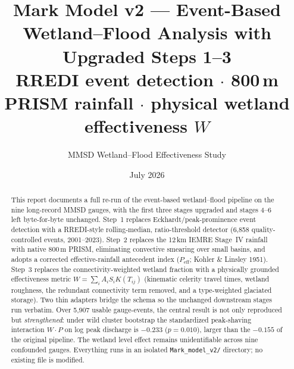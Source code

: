 \documentclass[11pt]{article}
\title{\textbf{Mark Model v2 --- Event-Based Wetland--Flood Analysis with
Upgraded Steps 1--3}\\[4pt]
\large RREDI event detection $\cdot$ 800\,m PRISM rainfall $\cdot$ physical wetland
effectiveness $W$}
\author{MMSD Wetland--Flood Effectiveness Study}
\date{July 2026}
\begin{document}
\maketitle
\vspace{-1em}
\begin{abstract}\noindent\small
This report documents a full re-run of the event-based wetland--flood pipeline on the nine
long-record MMSD gauges, with the first three stages upgraded and stages 4--6 left byte-for-byte
unchanged. Step~1 replaces Eckhardt/peak-prominence event detection with a RREDI-style
rolling-median, ratio-threshold detector (6{,}858 quality-controlled events, 2001--2023).
Step~2 replaces the 12\,km IEMRE Stage~IV rainfall with native 800\,m PRISM, eliminating
convective smearing over small basins, and adopts a corrected effective-rainfall antecedent index
($P_{\text{eff}}$; Kohler \& Linsley 1951). Step~3 replaces the connectivity-weighted wetland
fraction with a physically grounded effectiveness metric $W=\sum_i A_i S_i K(T_{ij})$ (kinematic
celerity travel times, wetland roughness, the redundant connectivity term removed, and a
type-weighted glaciated storage). Two thin adapters bridge the schema so the unchanged downstream
stages run verbatim. Over 5{,}907 usable gauge-events, the central result is not only reproduced
but \emph{strengthened}: under wild cluster bootstrap the standardized peak-shaving interaction
$W\!\cdot\!P$ on log peak discharge is $-0.233$ ($p=0.010$), larger than the $-0.155$ of the
original pipeline. The wetland level effect remains unidentifiable across nine confounded gauges.
Everything runs in an isolated \texttt{Mark\_model\_v2/} directory; no existing file is modified.
\normalsize\end{abstract}
\end{document}
